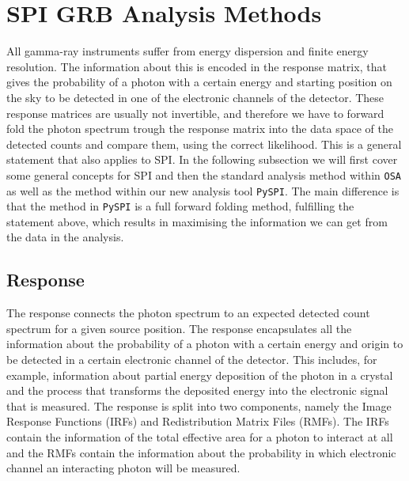 \documentclass[twocolumn,traditabstract]{aa}
\begin{document}
\section{SPI GRB Analysis Methods}
\label{methods}
All gamma-ray instruments suffer from energy dispersion and finite energy resolution. The information about this is encoded in the response matrix, that gives the probability of a photon with a certain energy and starting position on the sky to be detected in one of the electronic channels of the detector. These response matrices are usually not invertible, and therefore we have to forward fold the photon spectrum trough the response matrix into the data space of the detected counts and compare them, using the correct likelihood. This is a general statement that also applies to SPI. In the following subsection we will first cover some general concepts for SPI and then the standard analysis method within {\tt OSA} as well as the method within our new analysis tool {\tt PySPI}. The main difference is that the method in {\tt PySPI} is a full forward folding method, fulfilling the statement above, which results in maximising the information we can get from the data in the analysis.

\subsection{Response}
\label{response}

The response connects the photon spectrum to an expected detected count spectrum for a given source position. The response encapsulates all the information about the probability of a photon with a certain energy and origin to be detected in a certain electronic channel of the detector. This includes, for example, information about partial energy deposition of the photon in a crystal and the process that transforms the deposited energy into the electronic signal that is measured.
The response is split into two components, namely the Image Response Functions (IRFs) and Redistribution Matrix Files (RMFs). The IRFs contain the information of the total effective area for a photon to interact at all and the RMFs contain the information about the probability in which electronic channel an interacting photon will be measured.
\end{document}
